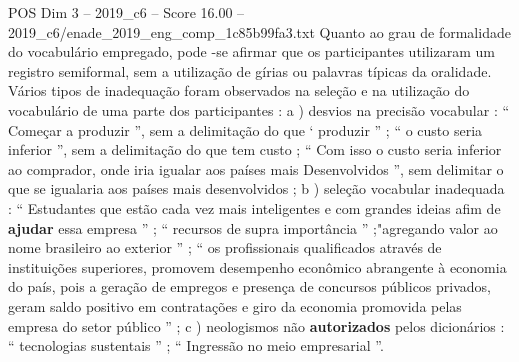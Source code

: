 \begin{textsample}{POS Dim 3 – 2019\_c6 – Score 16.00 – 2019\_c6/enade\_2019\_eng\_comp\_1c85b99fa3.txt}
Quanto ao grau de formalidade do vocabulário empregado, pode -se afirmar que os participantes utilizaram um registro semiformal, sem a utilização de gírias ou palavras típicas da oralidade.
Vários tipos de inadequação foram observados na seleção e na utilização do vocabulário de uma parte dos participantes : a ) desvios na precisão vocabular : “ Começar a produzir ”, sem a delimitação do que ‘ produzir ” ; “ o custo seria inferior ”, sem a delimitação do que tem custo ; “ Com isso o custo seria inferior ao comprador, onde iria igualar aos países mais Desenvolvidos ”, sem delimitar o que se igualaria aos países mais desenvolvidos ; b ) seleção vocabular inadequada : “ Estudantes que estão cada vez mais inteligentes e com grandes ideias afim de \textbf{ajudar} essa empresa ” ; “ recursos de supra importância ” ;"agregando valor ao nome brasileiro ao exterior ” ; “ os profissionais qualificados através de instituições superiores, promovem desempenho econômico abrangente à economia do país, pois a geração de empregos e presença de concursos públicos privados, geram saldo positivo em contratações e giro da economia promovida pelas empresa do setor público ” ; c ) neologismos não \textbf{autorizados} pelos dicionários : “ tecnologias sustentais ” ; “ Ingressão no meio empresarial ”.

\end{textsample}
